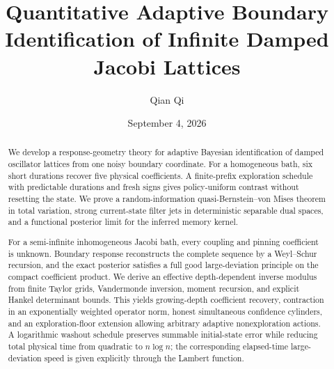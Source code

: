 \documentclass[11pt,reqno]{amsart}
\title[Quantitative adaptive Jacobi identification]{Quantitative Adaptive Boundary Identification of Infinite Damped Jacobi Lattices}
\author{Qian Qi}
\date{September 4, 2026}
\begin{document}
\begin{abstract}
We develop a response-geometry theory for adaptive Bayesian identification of
damped oscillator lattices from one noisy boundary coordinate.  For a
homogeneous bath, six short durations recover five physical coefficients.  A
finite-prefix exploration schedule with predictable durations and fresh signs
gives policy-uniform contrast without resetting the state.  We prove a
random-information quasi-Bernstein--von Mises theorem in total variation,
strong current-state filter jets in deterministic separable dual spaces, and a
functional posterior limit for the inferred memory kernel.

For a semi-infinite inhomogeneous Jacobi bath, every coupling and pinning
coefficient is unknown.  Boundary response reconstructs the complete sequence
by a Weyl--Schur recursion, and the exact posterior satisfies a full good
large-deviation principle on the compact coefficient product.  We derive an
effective depth-dependent inverse modulus from finite Taylor grids,
Vandermonde inversion, moment recursion, and explicit Hankel determinant
bounds.  This yields growing-depth coefficient recovery, contraction in an
exponentially weighted operator norm, honest simultaneous confidence
cylinders, and an exploration-floor extension allowing arbitrary adaptive
nonexploration actions.  A logarithmic washout schedule preserves summable
initial-state error while reducing total physical time from quadratic to
\(n\log n\); the corresponding elapsed-time large-deviation speed is given
explicitly through the Lambert function.
\end{abstract}

\maketitle
\tableofcontents









\appendix


\end{document}
